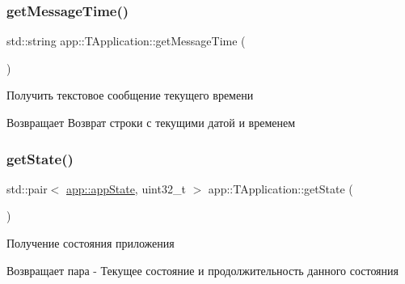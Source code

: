 \subsubsection{\texorpdfstring{get\+Message\+Time()}{getMessageTime()}}
{\footnotesize\ttfamily std\+::string app\+::\+T\+Application\+::get\+Message\+Time (\begin{DoxyParamCaption}{ }\end{DoxyParamCaption})}



Получить текстовое сообщение текущего времени 

\begin{DoxyReturn}{Возвращает}
Возврат строки с текущими датой и временем 
\end{DoxyReturn}
\mbox{\label{classapp_1_1_t_application_a254728135b699d84f82a334708b1fbda}} 
\subsubsection{\texorpdfstring{get\+State()}{getState()}}
{\footnotesize\ttfamily std\+::pair$<$ \hyperlink{group___xD0_x9F_xD0_xB5_xD1_x80_xD0_xB5_xD1_x87_xD0_xB8_xD1_x81_xD0_xBB_xD0_xB5_xD0_xBD_xD0_xB8_xD1_x8F_ga290e8080c661e52c2f685fd4af148acf}{app\+::app\+State}, uint32\+\_\+t $>$ app\+::\+T\+Application\+::get\+State (\begin{DoxyParamCaption}{ }\end{DoxyParamCaption})}



Получение состояния приложения 

\begin{DoxyReturn}{Возвращает}
пара -\/ Текущее состояние и продолжительность данного состояния 
\end{DoxyReturn}
\mbox{\label{classapp_1_1_t_application_a1d5d4282bfbee6c984b10394f50a6cab}} 
